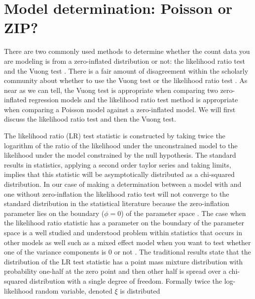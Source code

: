 \documentclass{article}
\begin{document}
\section{Model determination: Poisson or ZIP?}
There are two commonly used methods to determine whether the count data you are modeling is from a zero-inflated distribution or not: the likelihood ratio test and the Vuong test \cite{vuong1989likelihood}.  
There is a fair amount of disagreement within the scholarly community about whether to use the Vuong test or the likelihood ratio test \cite{wilson2015misuse}. As near as we can tell, the Vuong test is appropriate when comparing two zero-inflated regression models and the likelihood ratio test method is appropriate when comparing a Poisson model against a zero-inflated model. We will first discuss the likelihood ratio test and then the Vuong test. 

The likelihood ratio (LR) test statistic is constructed by taking twice the logarithm of the ratio of the likelihood under the unconstrained model to the likelihood under the model constrained by the null hypothesis. The standard results in statistics, applying a second order taylor series and taking limits, implies that this statistic will be asymptotically distributed as a chi-squared distribution. In our case of making a determination between a model with and one without zero-inflation the likelihood ratio test will not converge to the standard distribution in the statistical literature because the zero-inflation parameter lies on the boundary ($\phi=0$) of the parameter space \cite{chernoff1954distribution,feng1992statistical,self1987asymptotic}. The case when the likelihood ratio statistic has a parameter on the boundary of the parameter space is a well studied and understood problem within statistics that occurs in other models as well such as a mixed effect model when you want to test whether one of the variance components is 0 or not \cite{crainiceanu2004likelihood}. The traditional results state that the distribution of the LR test statistic has a point mass mixture distribution with probability one-half at the zero point and then other half is spread over a chi-squared distribution with a single degree of freedom. Formally twice the log-likelihood random variable, denoted $\xi$ is distributed 
\end{document}

